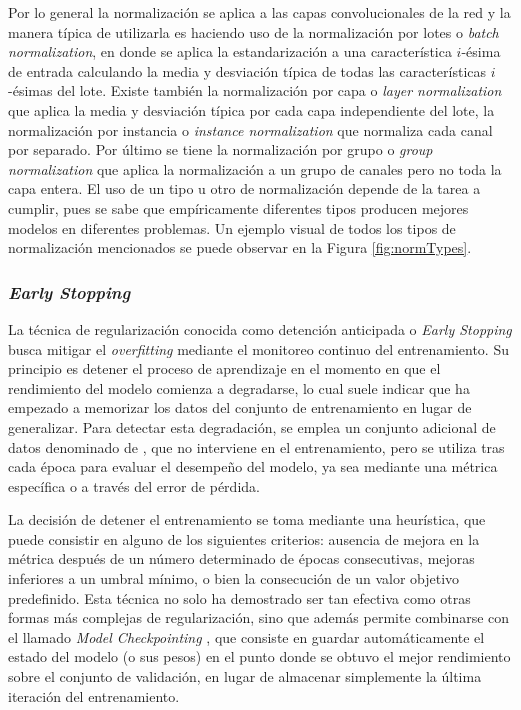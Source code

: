 Por lo general la normalización se aplica a las capas convolucionales de la red y la manera típica de utilizarla es haciendo uso de la normalización por lotes o \textit{batch normalization}, en donde se aplica la estandarización a una característica $i$-ésima de entrada calculando la media y desviación típica de todas las características $i$-ésimas del lote. Existe también la normalización por capa o \textit{layer normalization} que aplica la media y desviación típica por cada capa independiente del lote, la normalización por instancia o \textit{instance normalization} que normaliza cada canal por separado. Por último se tiene la normalización por grupo o \textit{group normalization} que aplica la normalización a un grupo de canales pero no toda la capa entera. El uso de un tipo u otro de normalización depende de la tarea a cumplir, pues se sabe que empíricamente diferentes tipos producen mejores modelos en diferentes problemas. Un ejemplo visual de todos los tipos de normalización mencionados se puede observar en la Figura \ref{fig:normTypes}. 

\subsubsection{\textit{Early Stopping}}
La técnica de regularización conocida como detención anticipada o \textit{Early Stopping} \cite{prechelt_early_1998} busca mitigar el \textit{overfitting} mediante el monitoreo continuo del entrenamiento. Su principio es detener el proceso de aprendizaje en el momento en que el rendimiento del modelo comienza a degradarse, lo cual suele indicar que ha empezado a memorizar los datos del conjunto de entrenamiento en lugar de generalizar. Para detectar esta degradación, se emplea un conjunto adicional de datos denominado de , que no interviene en el entrenamiento, pero se utiliza tras cada época para evaluar el desempeño del modelo, ya sea mediante una métrica específica o a través del error de pérdida.

La decisión de detener el entrenamiento se toma mediante una heurística, que puede consistir en alguno de los siguientes criterios: ausencia de mejora en la métrica después de un número determinado de épocas consecutivas, mejoras inferiores a un umbral mínimo, o bien la consecución de un valor objetivo predefinido. Esta técnica no solo ha demostrado ser tan efectiva como otras formas más complejas de regularización, sino que además permite combinarse con el llamado \textit{Model Checkpointing} \cite{geron_hands-machine_2019}, que consiste en guardar automáticamente el estado del modelo (o sus pesos) en el punto donde se obtuvo el mejor rendimiento sobre el conjunto de validación, en lugar de almacenar simplemente la última iteración del entrenamiento.


